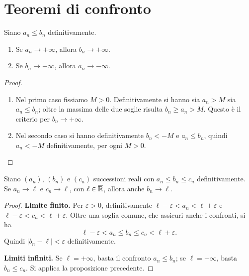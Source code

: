 \section{Teoremi di confronto}

\begin{proposizione}
Siano $a_n\le b_n$ definitivamente. \begin{enumerate}[label=\arabic*.]
\item Se $a_n\to+\infty$, allora $b_n\to+\infty$.
\item Se $b_n\to-\infty$, allora $a_n\to-\infty$.
\end{enumerate}
\end{proposizione}
\begin{proof}
\begin{enumerate}[label=\arabic*.]
\item Nel primo caso fissiamo $M>0$. Definitivamente si hanno sia $a_n>M$ sia $a_n\le b_n$; oltre la massima delle due soglie risulta $b_n\ge a_n>M$. Questo è il criterio per $b_n\to+\infty$.
\item Nel secondo caso si hanno definitivamente $b_n<-M$ e $a_n\le b_n$, quindi $a_n<-M$ definitivamente, per ogni $M>0$.
\end{enumerate}
\end{proof}

\begin{teorema}
\label{teo:carabinieri}
Siano $(a_n)$, $(b_n)$ e $(c_n)$ successioni reali con $a_n\le b_n\le c_n$ definitivamente. Se $a_n\to\ell$ e $c_n\to\ell$, con $\ell\in\overline{\mathbb{R}}$, allora anche $b_n\to\ell$.
\end{teorema}
\begin{proof}
\textbf{Limite finito.} Per $\varepsilon>0$, definitivamente $\ell-\varepsilon<a_n<\ell+\varepsilon$ e $\ell-\varepsilon<c_n<\ell+\varepsilon$. Oltre una soglia comune, che assicuri anche i confronti, si ha
\[
\ell-\varepsilon<a_n\le b_n\le c_n<\ell+\varepsilon.
\]
Quindi $|b_n-\ell|<\varepsilon$ definitivamente.

\textbf{Limiti infiniti.} Se $\ell=+\infty$, basta il confronto $a_n\le b_n$; se $\ell=-\infty$, basta $b_n\le c_n$. Si applica la proposizione precedente.
\end{proof}

